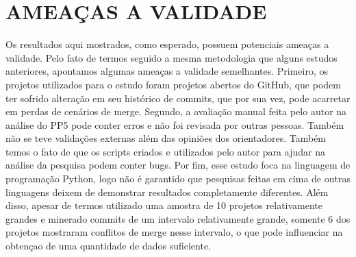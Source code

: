 \section{AMEAÇAS A VALIDADE}
Os resultados aqui mostrados, como esperado, possuem potenciais ameaças a validade. Pelo fato de termos seguido
a mesma metodologia que alguns estudos anteriores, apontamos algumas ameaças a validade semelhantes.
Primeiro, os projetos utilizados para
o estudo foram projetos abertos do GitHub, que podem ter sofrido
alteração em seu histórico de commits, que por sua vez, pode
acarretar em perdas de cenários de merge.
Segundo, a avaliação manual feita pelo autor na análise do PP5 pode conter erros e não foi revisada por outras pessoas.
Também não se teve validações externas além das opiniões dos orientadores.
Também temos o fato de que os scripts criados e utilizados pelo autor para ajudar na análise da pesquisa podem conter bugs.
Por fim, esse estudo foca na linguagem de programação Python, logo não é garantido que pesquisas feitas em cima de outras
linguagens deixem de demonstrar resultados completamente diferentes.
Além disso, apesar de termos utilizado uma amostra de 10 projetos relativamente grandes e minerado commits de um intervalo
relativamente grande, somente 6 dos projetos mostraram conflitos de merge nesse intervalo, o que pode influenciar na obtençao de
uma quantidade de dados suficiente.



